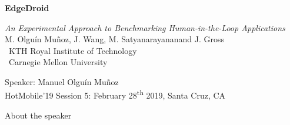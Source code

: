 \documentclass[aspectratio=1610]{beamer}
\newcommand{\kthaffil}{\textsuperscript{\textdagger}}
\newcommand{\cmuaffil}{\textsuperscript{\textdaggerdbl}}
\begin{document}
\startpage
\begin{frame}{}
    \begin{center}
        \begin{Large}
            \textbf{EdgeDroid} 
        \end{Large}
    
        \emph{An Experimental Approach to Benchmarking Human-in-the-Loop Applications}\\
        \vspace{0.02\textheight}
        {\footnotesize M. Olguín Muñoz\kthaffil, J. Wang\cmuaffil, M. Satyanarayanan\cmuaffil and J. Gross\kthaffil\\
        \vspace{0.02\textheight}
        \kthaffil~KTH Royal Institute of Technology\\
        \cmuaffil~Carnegie Mellon University\\}
    \end{center}

    \vspace{0.03\textheight}

    \begin{footnotesize}
        \raggedleft%
        Speaker: Manuel Olguín Muñoz\\
        {\tiny HotMobile'19 Session 5: February 28\textsuperscript{th} 2019, Santa Cruz, CA}\\
    \end{footnotesize}
\end{frame}

\normalpage
\begin{frame}{About the speaker}
    
\end{frame}
\end{document}
